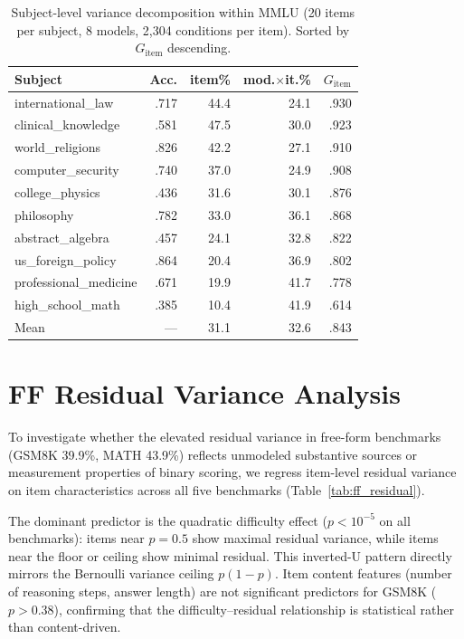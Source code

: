\begin{table}[h]
\centering
\caption{Subject-level variance decomposition within MMLU (20 items per subject, 8 models, 2,304 conditions per item). Sorted by $G_\text{item}$ descending.}
\label{tab:subject_gstudy}
\scriptsize
\begin{tabular}{lrrrr}
\toprule
Subject & Acc. & item\% & mod.$\times$it.\% & $G_\text{item}$ \\
\midrule
international\_law & .717 & 44.4 & 24.1 & .930 \\
clinical\_knowledge & .581 & 47.5 & 30.0 & .923 \\
world\_religions & .826 & 42.2 & 27.1 & .910 \\
computer\_security & .740 & 37.0 & 24.9 & .908 \\
college\_physics & .436 & 31.6 & 30.1 & .876 \\
philosophy & .782 & 33.0 & 36.1 & .868 \\
abstract\_algebra & .457 & 24.1 & 32.8 & .822 \\
us\_foreign\_policy & .864 & 20.4 & 36.9 & .802 \\
professional\_medicine & .671 & 19.9 & 41.7 & .778 \\
high\_school\_math & .385 & 10.4 & 41.9 & .614 \\
\midrule
Mean & --- & 31.1 & 32.6 & .843 \\
\bottomrule
\end{tabular}
\end{table}

\section{FF Residual Variance Analysis}
\label{app:ff_residual}

To investigate whether the elevated residual variance in free-form benchmarks (GSM8K 39.9\%, MATH 43.9\%) reflects unmodeled substantive sources or measurement properties of binary scoring, we regress item-level residual variance on item characteristics across all five benchmarks (Table~\ref{tab:ff_residual}).

The dominant predictor is the quadratic difficulty effect ($p < 10^{-5}$ on all benchmarks): items near $p = 0.5$ show maximal residual variance, while items near the floor or ceiling show minimal residual. This inverted-U pattern directly mirrors the Bernoulli variance ceiling $p(1{-}p)$. Item content features (number of reasoning steps, answer length) are not significant predictors for GSM8K ($p > 0.38$), confirming that the difficulty--residual relationship is statistical rather than content-driven.

